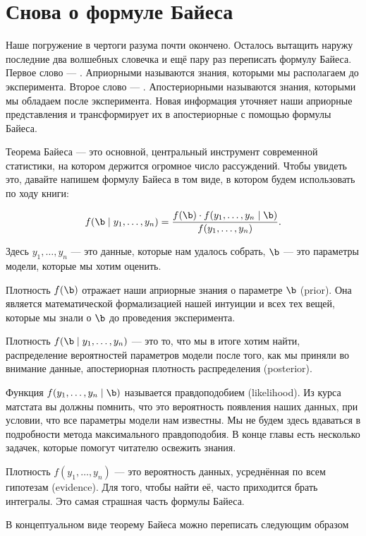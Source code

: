 \documentclass[12pt, a4paper, oneside]{article}
\begin{document}
\section{Снова о формуле Байеса}

Наше погружение в чертоги разума почти окончено. Осталось вытащить наружу последние два волшебных словечка и ещё пару раз переписать формулу Байеса.  Первое слово --- . Априорными называются знания, которыми мы располагаем до эксперимента. Второе слово --- . Апостериорными называются знания, которыми мы обладаем после эксперимента. Новая информация уточняет наши априорные представления и трансформирует их в апостериорные с помощью формулы Байеса.

Теорема Байеса --- это основной, центральный инструмент современной статистики, на котором держится огромное число рассуждений. Чтобы увидеть это, давайте напишем формулу Байеса в том виде, в котором будем использовать по ходу книги: 

\[ 
f(\b \mid y_1, \ldots, y_n) = \frac{f(\b) \cdot f(y_1, \ldots, y_n \mid \b)}{f(y_1, \ldots, y_n)}.
\]

Здесь $y_1, \ldots, y_n$ --- это данные, которые нам удалось собрать, $\b$ --- это параметры модели, которые мы хотим оценить.   

Плотность $f(\b)$ отражает наши априорные знания о параметре $\b$ (prior).  Она является математической формализацией нашей интуиции и всех тех вещей, которые мы знали о $\b$ до проведения эксперимента. 

Плотность $f(\b \mid y_1, \ldots, y_n) $ --- это то, что мы в итоге хотим найти, распределение вероятностей параметров модели после того, как мы приняли во внимание данные, апостериорная плотность распределения (posterior).  

Функция $f(y_1, \ldots, y_n \mid \b )$ называется правдоподобием (likelihood). Из курса матстата вы должны помнить, что это вероятность появления наших данных, при условии, что все параметры модели нам известны. Мы не будем здесь вдаваться в подробности метода максимального правдоподобия. В конце главы есть несколько задачек, которые помогут читателю освежить знания. 
 
Плотность $f(y_1, \ldots, y_n)$ --- это вероятность данных, усреднённая по всем гипотезам (evidence).  Для того, чтобы найти её, часто приходится брать интегралы. Это самая страшная часть формулы Байеса. 

В концептуальном виде теорему Байеса можно переписать следующим образом
\end{document}
